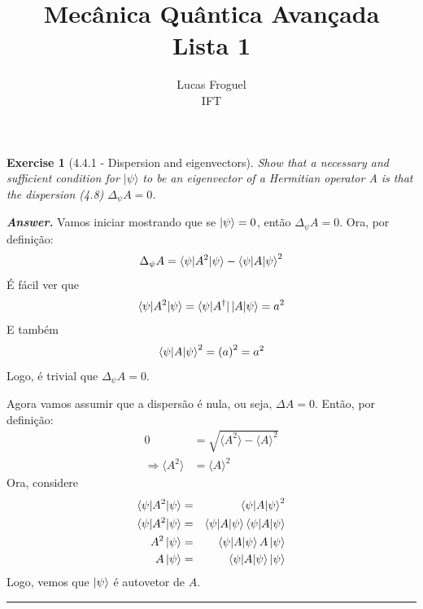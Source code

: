 \documentclass[12pt]{article}
\title{Mecânica Quântica Avançada \\ Lista 1}
\author{Lucas Froguel \\ IFT}
\date{}
\def\be{\begin{equation}}
\def\ee{\end{equation}}
\def\bea{\begin{eqnarray*}}
\def\eea{\end{eqnarray*}}
\def\l{\left}
\def\r{\right}
\newtheorem{exercise}{Exercise}
\newenvironment{answer}{\noindent\textbf{\textit{Answer.}} \normalfont }{\par\noindent\rule{\textwidth}{0.4pt}}
\begin{document}
	\maketitle
	\listoftheorems[title={List of Exercises}]

	\begin{exercise}[4.4.1 - Dispersion and eigenvectors]
		Show that a necessary and sufficient condition for $|\psi\rangle$ to be an eigenvector of a Hermitian
		operator A is that the dispersion (4.8) $\Delta_\psi A = 0$.
	\end{exercise}
	\begin{answer}
		Vamos iniciar mostrando que se $\ket{\psi}=0$, então $\Delta_\psi A = 0$. Ora, por definição:
		\be
			\Delta_\psi A = \braket{\psi|A^2|\psi} - \braket{\psi|A|\psi}^2
		\ee
		É fácil ver que
		\be
			\braket{\psi|A^2|\psi} = \bra{\psi|A^\dagger}\ket{A|\psi} = a^2
		\ee
		E também
		\be
			\braket{\psi|A|\psi}^2 = \l(a\r)^2 = a^2
		\ee
		Logo, é trivial que $\Delta_\psi A = 0$. 
		
		Agora vamos assumir que a dispersão é nula, ou seja, $\Delta A = 0$. Então, por definição:		
		\begin{align}
			0 &= \sqrt{\langle A^2 \rangle - \langle A \rangle^2} \\
			\Rightarrow \langle A^2 \rangle &= \langle A \rangle^2
		\end{align}	
		Ora, considere
		\bea
			\braket{\psi|A^2|\psi} &=& \braket{\psi|A|\psi}^2 \\
			\braket{\psi|A^2|\psi} &=& \braket{\psi|A|\psi}\braket{\psi|A|\psi} \\
			A^2\ket{\psi} &=& \braket{\psi|A|\psi} A\ket{\psi} \\
			A\ket{\psi} &=& \braket{\psi|A|\psi} \ket{\psi} 
		\eea
		Logo, vemos que $\ket{\psi}$ é autovetor de $A$.
				
	\end{answer}
\end{document}
